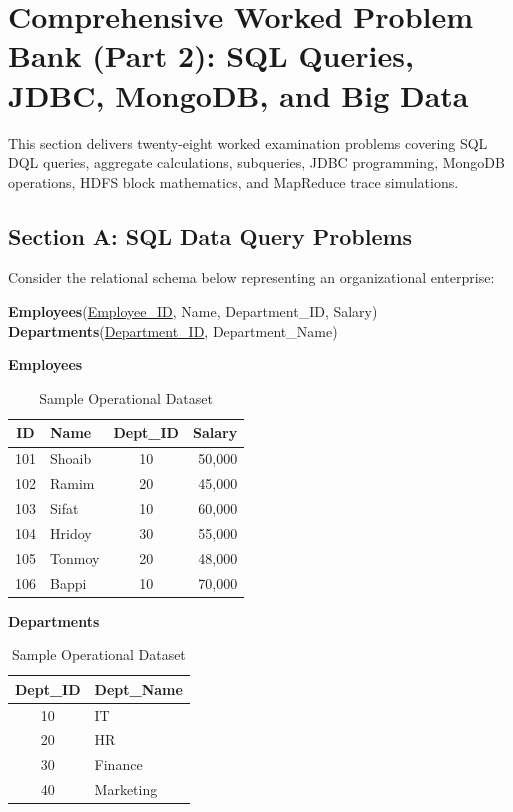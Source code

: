 \section{Comprehensive Worked Problem Bank (Part 2): SQL Queries, JDBC, MongoDB, and Big Data}
\label{sec:dbms_problems_part2}

This section delivers twenty-eight worked examination problems covering SQL DQL queries, aggregate calculations, subqueries, JDBC programming, MongoDB operations, HDFS block mathematics, and MapReduce trace simulations.

\subsection{Section A: SQL Data Query Problems}

Consider the relational schema below representing an organizational enterprise:
\begin{center}
\textbf{Employees}(\underline{Employee\_ID}, Name, Department\_ID, Salary) \\
\textbf{Departments}(\underline{Department\_ID}, Department\_Name)
\end{center}

\begin{table}[htbp]
\centering
\small
\caption{Sample Operational Dataset}
\begin{minipage}{0.55\textwidth}
\centering
\textbf{Employees}
\begin{tabularx}{0.75\textwidth}{c X c r}
\toprule
\textbf{ID} & \textbf{Name} & \textbf{Dept\_ID} & \textbf{Salary} \\
\midrule
101 & Shoaib  & 10 & 50,000 \\
102 & Ramim  & 20 & 45,000 \\
103 & Sifat & 10 & 60,000 \\
104 & Hridoy  & 30 & 55,000 \\
105 & Tonmoy  & 20 & 48,000 \\
106 & Bappi   & 10 & 70,000 \\
\bottomrule
\end{tabularx}
\end{minipage}
\hfill
\begin{minipage}{0.40\textwidth}
\centering
\textbf{Departments}
\begin{tabularx}{0.6\textwidth}{c X}
\toprule
\textbf{Dept\_ID} & \textbf{Dept\_Name} \\
\midrule
10 & IT \\
20 & HR \\
30 & Finance \\
40 & Marketing \\
\bottomrule
\end{tabularx}
\end{minipage}
\end{table}

